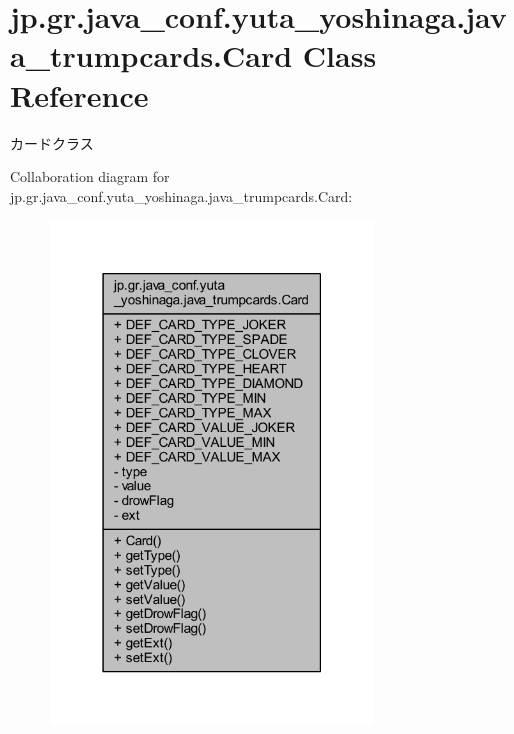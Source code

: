 \hypertarget{classjp_1_1gr_1_1java__conf_1_1yuta__yoshinaga_1_1java__trumpcards_1_1_card}{}\section{jp.\+gr.\+java\+\_\+conf.\+yuta\+\_\+yoshinaga.\+java\+\_\+trumpcards.\+Card Class Reference}
\label{classjp_1_1gr_1_1java__conf_1_1yuta__yoshinaga_1_1java__trumpcards_1_1_card}


カードクラス  




Collaboration diagram for jp.\+gr.\+java\+\_\+conf.\+yuta\+\_\+yoshinaga.\+java\+\_\+trumpcards.\+Card\+:
\nopagebreak
\begin{figure}[H]
\begin{center}
\leavevmode
\includegraphics[width=243pt]{classjp_1_1gr_1_1java__conf_1_1yuta__yoshinaga_1_1java__trumpcards_1_1_card__coll__graph}
\end{center}
\end{figure}
